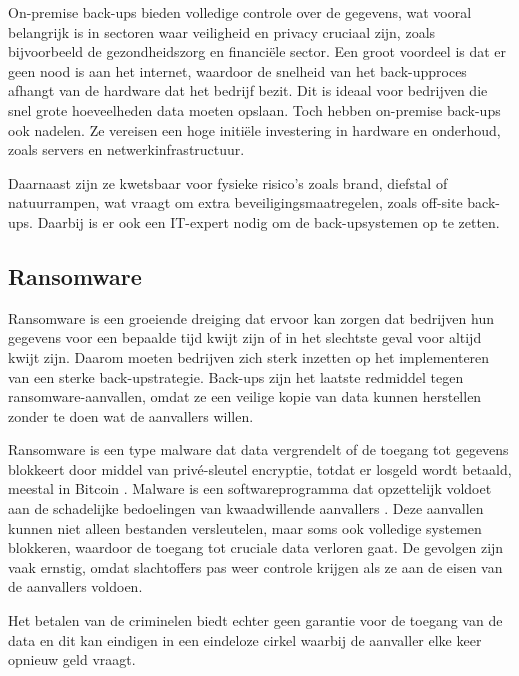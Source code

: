 On-premise back-ups bieden volledige controle over de gegevens, wat vooral belangrijk is in sectoren waar veiligheid en privacy cruciaal zijn, zoals bijvoorbeeld de gezondheidszorg en financiële sector. Een groot voordeel is dat er geen nood is aan het internet, waardoor de snelheid van het back-upproces afhangt van de hardware dat het bedrijf bezit. Dit is ideaal voor bedrijven die snel grote hoeveelheden data moeten opslaan. Toch hebben on-premise back-ups ook nadelen. Ze vereisen een hoge initiële investering in hardware en onderhoud, zoals servers en netwerkinfrastructuur. 

Daarnaast zijn ze kwetsbaar voor fysieke risico’s zoals brand, diefstal of natuurrampen, wat vraagt om extra beveiligingsmaatregelen, zoals off-site back-ups. Daarbij is er ook een IT-expert nodig om de back-upsystemen op te zetten.

\subsection{Ransomware}
Ransomware is een groeiende dreiging dat ervoor kan zorgen dat bedrijven hun gegevens voor een bepaalde tijd kwijt zijn of in het slechtste geval voor altijd kwijt zijn. Daarom moeten bedrijven zich sterk inzetten op het implementeren van een sterke back-upstrategie. Back-ups zijn het laatste redmiddel tegen ransomware-aanvallen, omdat ze een veilige kopie van data kunnen herstellen zonder te doen wat de aanvallers willen. 

Ransomware is een type malware dat data vergrendelt of de toegang tot gegevens blokkeert door middel van privé-sleutel encryptie, totdat er losgeld wordt betaald, meestal in Bitcoin \autocite{Richardson2017}. Malware is een softwareprogramma dat opzettelijk voldoet aan de schadelijke bedoelingen van kwaadwillende aanvallers \autocite{Yanfang2017}. Deze aanvallen kunnen niet alleen bestanden versleutelen, maar soms ook volledige systemen blokkeren, waardoor de toegang tot cruciale data verloren gaat. De gevolgen zijn vaak ernstig, omdat slachtoffers pas weer controle krijgen als ze aan de eisen van de aanvallers voldoen. 

Het betalen van de criminelen biedt echter geen garantie voor de toegang van de data en dit kan eindigen in een eindeloze cirkel waarbij de aanvaller elke keer opnieuw geld vraagt.

